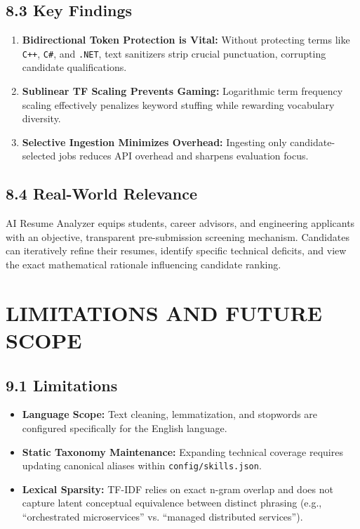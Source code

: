 \documentclass[11pt,a4paper]{article}
\begin{document}
\subsection{8.3 Key Findings}
\begin{enumerate}[noitemsep]
    \item \textbf{Bidirectional Token Protection is Vital:} Without protecting terms like \texttt{C++}, \texttt{C\#}, and \texttt{.NET}, text sanitizers strip crucial punctuation, corrupting candidate qualifications.
    \item \textbf{Sublinear TF Scaling Prevents Gaming:} Logarithmic term frequency scaling effectively penalizes keyword stuffing while rewarding vocabulary diversity.
    \item \textbf{Selective Ingestion Minimizes Overhead:} Ingesting only candidate-selected jobs reduces API overhead and sharpens evaluation focus.
\end{enumerate}

\subsection{8.4 Real-World Relevance}
AI Resume Analyzer equips students, career advisors, and engineering applicants with an objective, transparent pre-submission screening mechanism. Candidates can iteratively refine their resumes, identify specific technical deficits, and view the exact mathematical rationale influencing candidate ranking.

\newpage

\section{LIMITATIONS AND FUTURE SCOPE}

\subsection{9.1 Limitations}
\begin{itemize}[noitemsep]
    \item \textbf{Language Scope:} Text cleaning, lemmatization, and stopwords are configured specifically for the English language.
    \item \textbf{Static Taxonomy Maintenance:} Expanding technical coverage requires updating canonical aliases within \texttt{config/skills.json}.
    \item \textbf{Lexical Sparsity:} TF-IDF relies on exact n-gram overlap and does not capture latent conceptual equivalence between distinct phrasing (e.g., ``orchestrated microservices'' vs. ``managed distributed services'').
\end{itemize}
\end{document}
